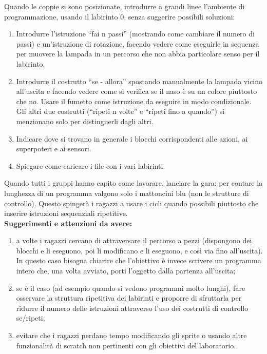 \documentclass[12pt]{article}
\begin{document}
Quando le coppie si sono posizionate, introdurre a grandi linee l’ambiente di programmazione, usando il labirinto 0, senza suggerire possibili soluzioni:
\begin{enumerate}
\item Introdurre l’istruzione ``fai n passi'' (mostrando come cambiare il numero di passi) e un’istruzione di rotazione, facendo vedere come eseguirle in sequenza per muovere la lampada in un percorso che non abbia particolare senso per il labirinto.
\item Introdurre il costrutto ``se - allora'' spostando manualmente la lampada vicino all'uscita e facendo vedere come si verifica se il naso è su un colore piuttosto che no. Usare il fumetto come istruzione da eseguire in modo condizionale. Gli altri due costrutti (``ripeti n volte'' e ``ripeti fino a quando'') si menzionano solo per distinguerli dagli altri.
\item Indicare dove si trovano in generale i blocchi corrispondenti alle azioni, ai superpoteri e ai sensori.
\item Spiegare come caricare i file con i vari labirinti.
\end{enumerate}

Quando tutti i gruppi hanno capito come lavorare, lanciare la gara: per contare la lunghezza di un programma valgono solo i mattoncini blu (non le strutture di controllo). Questo spingerà i ragazzi a usare i cicli quando possibili piuttosto che inserire istruzioni sequenziali ripetitive.\\

\textbf{Suggerimenti e attenzioni da avere:}
\begin{enumerate}
\item a volte i ragazzi cercano di attraversare il percorso a pezzi (dispongono dei blocchi e li eseguono, poi li modificano e li eseguono, e così via fino all’uscita). In questo caso bisogna chiarire che l’obiettivo è invece scrivere un programma intero che, una volta avviato, porti l’oggetto dalla partenza all’uscita;
\item se è il caso (ad esempio quando si vedono programmi molto lunghi), fare osservare la struttura ripetitiva dei labirinti e proporre di sfruttarla per ridurre il numero delle istruzioni attraverso l’uso dei costrutti di controllo se/ripeti;
\item evitare che i ragazzi perdano tempo modificando gli sprite o usando altre funzionalità di scratch non pertinenti con gli obiettivi del laboratorio.
\end{enumerate}
\end{document}

